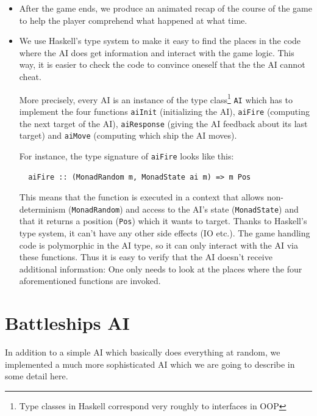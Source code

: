\documentclass[a4paper]{easychair}
\begin{document}
\begin{itemize}
 \item After the game ends, we produce an animated recap of the course of the game to help the player comprehend what happened at what time. 
 \item We use Haskell's type system to make it easy to find the places in the code where the AI does get information and interact with the game logic. This way, it is easier to check the code to convince oneself that the the AI cannot cheat.
 
 More precisely, every AI is an instance of the type class\footnote{Type classes in Haskell correspond very roughly to interfaces in OOP} \verb+AI+ which has to implement the four functions \verb+aiInit+ (initializing the AI), \verb+aiFire+ (computing the next target of the AI), \verb+aiResponse+ (giving the AI feedback about its last target) and \verb+aiMove+ (computing which ship the AI moves).
 
 For instance, the type signature of \verb+aiFire+ looks like this:
 \begin{verbatim}
  aiFire :: (MonadRandom m, MonadState ai m) => m Pos
 \end{verbatim}
 This means that the function is executed in a context that allows non-determinism (\verb|MonadRandom|) and access to the AI's state (\verb|MonadState|) and that it returns a position (\verb|Pos|) which it wants to target. Thanks to Haskell's type system, it can't have any other side effects (IO etc.). The game handling code is polymorphic in the AI type, so it can only interact with the AI via these functions. Thus it is easy to verify that the AI doesn't receive additional information: One only needs to look at the places where the four aforementioned functions are invoked.

\end{itemize}

\section{Battleships AI}
\label{sect:battleships-ai}
In addition to a simple AI which basically does everything at random, we implemented a much more sophisticated AI which we are going to describe in some detail here.
\end{document}
